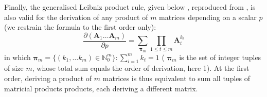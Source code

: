 \documentclass[long, final]{jobim}
\begin{document}
\begin{property}
Finally, the generalised Leibniz product rule, given below , reproduced from \cite{mulla20}, is also valid for the derivation of any product of $m$ matrices depending on a scalar $p$ (we restrain the formula to the first order only): 
\begin{equation*}
    \frac{\partial (\boldsymbol{A}_1 \ldots \boldsymbol{A}_m)}{\partial p} = \sum_{\boldsymbol{\pi}_m} \prod_{1\leq t \leq m}  \boldsymbol{A}_t^{k_t}
\end{equation*}
in which $\boldsymbol{\pi}_m = \{(k_1, \ldots k_m) \in \mathbb{N}_0^m \}: \sum_{i=1}^m k_t = 1$ ( $\boldsymbol{\pi}_m$ is the set of integer tuples of size $m$, whose total sum equals the order of derivation, here 1). At the first order, deriving a product of $m$ matrices is thus equivalent to sum all tuples of matricial products products, each deriving a different matrix. 
\end{property}
\end{document}
